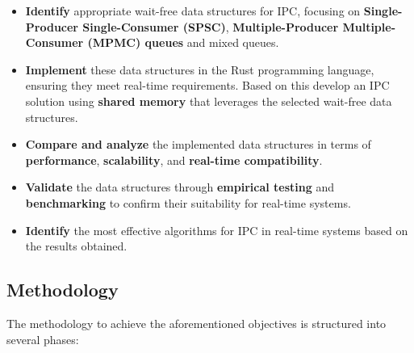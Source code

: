 \documentclass[ a4paper,
                toc=bibliography
              ]{scrartcl}
\begin{document}
\begin{itemize}
	\item \textbf{Identify} appropriate wait-free data structures for IPC, focusing on \textbf{Single-Producer Single-Consumer (SPSC)}, \textbf{Multiple-Producer Multiple-Consumer (MPMC) queues} and mixed queues.
	\item \textbf{Implement} these data structures in the Rust programming language, ensuring they meet real-time requirements. Based on this develop an IPC solution using \textbf{shared memory} that leverages the selected wait-free data structures.
	\item \textbf{Compare and analyze} the implemented data structures in terms of \textbf{performance}, \textbf{scalability}, and \textbf{real-time compatibility}.
	\item \textbf{Validate} the data structures through \textbf{empirical testing} and \textbf{benchmarking} to confirm their suitability for real-time systems.
	\item \textbf{Identify} the most effective algorithms for IPC in real-time systems based on the results obtained.
\end{itemize}

\subsection{Methodology}

The methodology to achieve the aforementioned objectives is structured into several phases:
\end{document}
